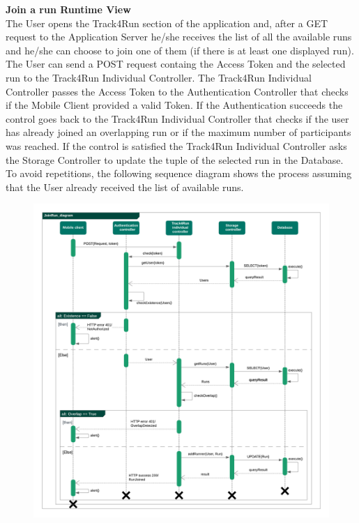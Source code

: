 \begin{legal}
\begin{legal}
				\newpage
				\item \textbf{Join a run Runtime View}\\
The User opens the Track4Run section of the application and, after a GET request to the Application Server he/she receives the list of all the available runs and he/she can choose to join one of them (if there is at least one displayed run).
The User can send a POST request containg the Access Token and the selected run to the Track4Run Individual Controller.
The Track4Run Individual Controller passes the Access Token to the Authentication Controller that checks if the Mobile Client provided a valid Token.
If the Authentication succeeds the control goes back to the Track4Run Individual Controller that checks if the user has already joined an overlapping run or if the maximum number of participants was reached.
If the control is satisfied the Track4Run Individual Controller asks the Storage Controller to update the tuple of the selected run in the Database.
To avoid repetitions, the following sequence diagram shows the process assuming that the User already received the list of available runs.
				\begin{figure}[H]
				\includegraphics[width=\linewidth]{images/seq_diagrams/seq_JoinRun.png}\\
				\end{figure}
				

\end{legal}
\end{legal}
